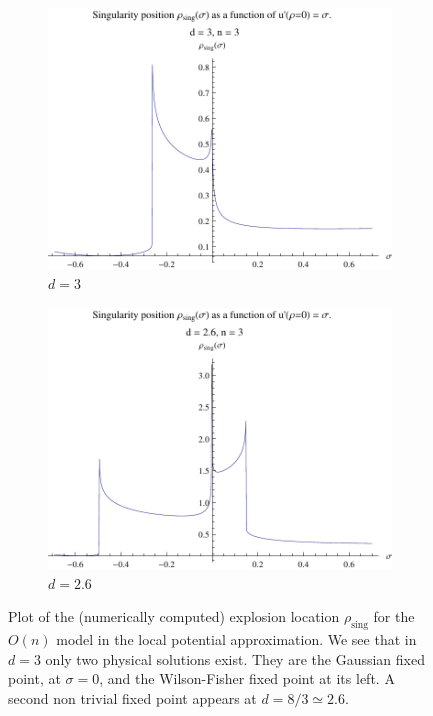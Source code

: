 \begin{figure}[htp]
\centering
\begin{subfigure}{.55\textwidth}
	\centering
	\includegraphics[width=.9\linewidth]{img/chap4/on_d3_n3.pdf}
	\caption{$d=3$}
	\label{on_d_3}
	\end{subfigure}%
\begin{subfigure}{.55\textwidth}
	\centering
	\includegraphics[width=.9\linewidth]{img/chap4/on_d2p6_n3.pdf}
	\caption{$d=2.6$}
	\label{on_d_2p6}
\end{subfigure}
\caption{Plot of the (numerically computed) explosion location $\rho_{\text{sing}}$ for the $O(n)$ model in the local potential approximation. We see that in $d=3$ only two physical solutions exist. They are the Gaussian fixed point, at $\sigma = 0$, and the Wilson-Fisher fixed point at its left. A second non trivial fixed point appears at $d = 8/3 \simeq 2.6$.}
\label{fig:on_fp}
\end{figure}

